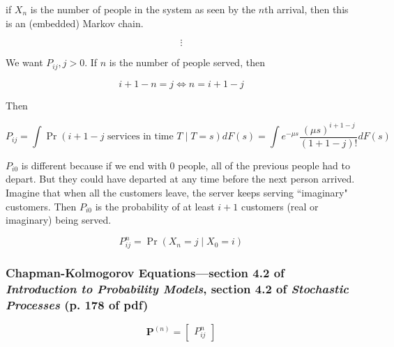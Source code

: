 \begin{example} if \(X_n\) is the number of people in the system as seen by the \(n\)th arrival, then this is an (embedded) Markov chain.

\[
\vdots
\]

We want \(P_{ij}, j > 0\). If \(n\) is the number of people served, then 

\[
i + 1 - n = j \iff n = i + 1 - j
\]

Then

\[
P_{ij} = \int \Pr(i + 1 - j \text{ services in time } T \mid T = s) dF(s) = \int e^{- \mu s} \frac{(\mu s)^{i+1-j}}{(1+1-j)!} dF(s) 
\]

\(P_{i0}\) is different because if we end with 0 people, all of the previous people had to depart. But they could have departed at any time before the next person arrived. Imagine that when all the customers leave, the server keeps serving ``imaginary" customers. Then \(P_{i0}\) is the probability of at least \(i+1\) customers (real or imaginary) being served.

\end{example}


\begin{definition}

\[
P_{ij}^n = \Pr(X_n = j \mid X_0 = i)
\]

\end{definition}

\subsubsection{Chapman-Kolmogorov Equations---section 4.2 of \textit{Introduction to Probability Models}, section 4.2 of \textit{Stochastic Processes} (p. 178 of pdf)}

\begin{proposition}

\end{proposition}

\begin{definition}

\[
\boldsymbol{P}^{(n)} = \begin{bmatrix}P_{ij}^n \end{bmatrix}
\]

\end{definition}

